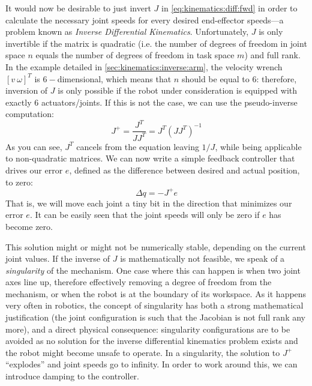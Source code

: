 It would now be desirable to just invert $J$ in \cref{eq:kinematics:diff:fwd} in order to calculate the necessary joint speeds for every desired end-effector speeds---a problem known as \textsl{Inverse Differential Kinematics}. Unfortunately, $J$ is only invertible if the matrix is quadratic (i.e. the number of degrees of freedom in joint space $n$ equals the number of degrees of freedom in task space $m$) and full rank.
In the example detailed in \cref{sec:kinematics:inverse:arm}, the velocity wrench $[v \ \omega]^T$ is $6-$dimensional, which means that $n$ should be equal to $6$: therefore, inversion of $J$ is only possible if the robot under consideration is equipped with exactly $6$ actuators/joints.
If this is not the case, we can use the pseudo-inverse computation:
\begin{equation}
J^+=\frac{J^T}{JJ^T}=J^T(JJ^T)^{-1}\label{eq:kinematics:diff:pseudoinverse}
\end{equation}
As you can see, $J^T$ cancels from the equation leaving $1/J$, while being applicable to non-quadratic matrices.
We can now write a simple feedback controller that drives our error $e$, defined as the difference between desired and actual position, to zero:
\begin{equation}
\Delta{q}=-J^+e
\end{equation}
That is, we will move each joint a tiny bit in the direction that minimizes our error $e$.
It can be easily seen that the joint speeds will only be zero if $e$ has become zero.

This solution might or might not be numerically stable, depending on the current joint values. If the inverse of $J$ is mathematically not feasible, we speak of a \textsl{singularity} of the mechanism. One case where this can happen is when two joint axes line up, therefore effectively removing a degree of freedom from the mechanism, or when the robot is at the boundary of its workspace. As it happens very often in robotics, the concept of singularity has both a strong mathematical justification (the joint configuration is such that the Jacobian is not full rank any more), and a direct physical consequence: singularity configurations are to be avoided as no solution for the inverse differential kinematics problem exists and the robot might become unsafe to operate.
In a singularity, the solution to $ J^+$ ``explodes'' and joint speeds go to infinity. In order to work around this, we can introduce damping to the controller.

